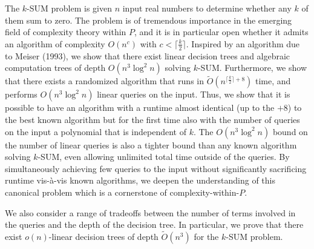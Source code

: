 The $k$-SUM problem is given $n$ input real numbers to determine whether any
$k$ of them sum to zero. The problem is of tremendous importance in the
emerging field of complexity theory within $P$, and it is in particular open
whether it admits an algorithm of complexity $O(n^c)$ with $c<\lceil
\frac{k}{2} \rceil$. Inspired by an algorithm due to Meiser (1993), we show
that there exist linear decision trees and algebraic computation trees of depth
$O(n^3\log^2 n)$ solving $k$-SUM. Furthermore, we show that there exists a
randomized algorithm that runs in $\tilde{O}(n^{\lceil\frac{k}{2}\rceil+8})$ time,
and performs $O(n^3\log^2 n)$ linear queries on the input. Thus, we show that
it is possible to have an algorithm with a runtime almost identical (up to the
$+8$) to the best known algorithm but for the first time also with the number
of queries on the input a polynomial that is independent of $k$. The
$O(n^3\log^2 n)$ bound on the number of linear queries is also a tighter bound
than any known algorithm solving $k$-SUM, even allowing unlimited total time
outside of the queries.
By simultaneously achieving few queries to the input without significantly
sacrificing runtime vis-\`{a}-vis known algorithms, we deepen the understanding
of this canonical problem which is a cornerstone of complexity-within-$P$.

We also consider a range of tradeoffs between the number of terms involved in
the queries and the depth of the decision tree. In particular, we prove that
there exist $o(n)$-linear decision trees of depth $\tilde{O}(n^3)$ for the
$k$-SUM problem.
